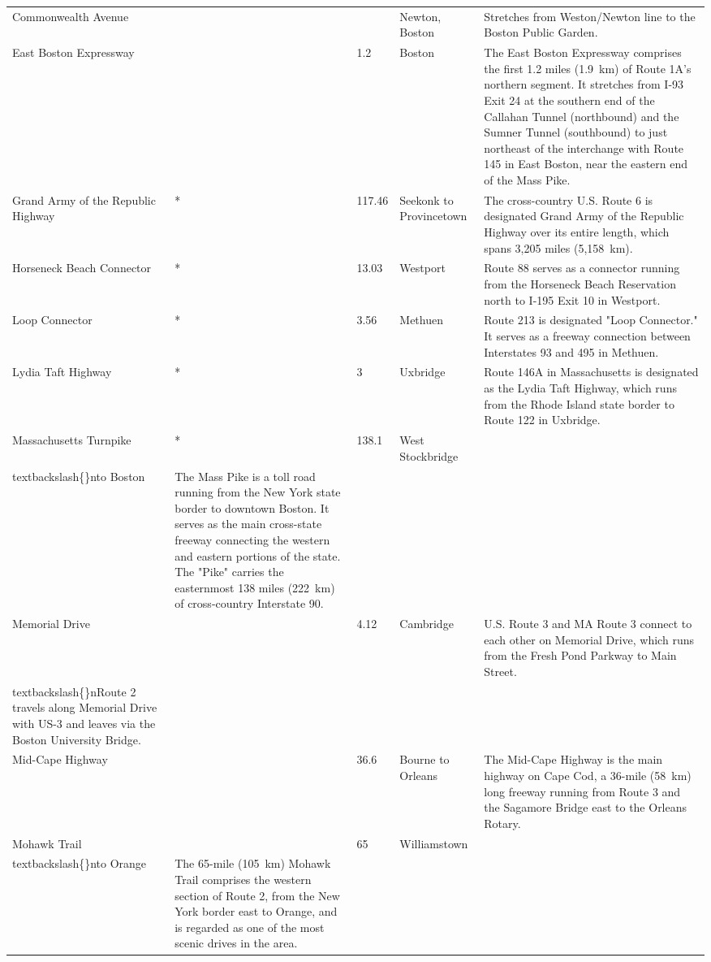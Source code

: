 \documentclass{article}
\begin{document}
\begin{tabular}{lllll}
Commonwealth Avenue &  &  & Newton, Boston & Stretches from Weston/Newton line to the Boston Public Garden. \\
East Boston Expressway &  & 1.2 & Boston & The East Boston Expressway comprises the first 1.2 miles (1.9 km) of Route 1A's northern segment. It stretches from I-93 Exit 24 at the southern end of the Callahan Tunnel (northbound) and the Sumner Tunnel (southbound) to just northeast of the interchange with Route 145 in East Boston, near the eastern end of the Mass Pike. \\
Grand Army of the Republic Highway & * & 117.46 & Seekonk to Provincetown & The cross-country U.S. Route 6 is designated Grand Army of the Republic Highway over its entire length, which spans 3,205 miles (5,158 km). \\
Horseneck Beach Connector & * & 13.03 & Westport & Route 88 serves as a connector running from the Horseneck Beach Reservation north to I-195 Exit 10 in Westport. \\
Loop Connector & * & 3.56 & Methuen & Route 213 is designated "Loop Connector." It serves as a freeway connection between Interstates 93 and 495 in Methuen. \\
Lydia Taft Highway & * & 3 & Uxbridge & Route 146A in Massachusetts is designated as the Lydia Taft Highway, which runs from the Rhode Island state border to Route 122 in Uxbridge. \\
Massachusetts Turnpike & * & 138.1 & West Stockbridge\\textbackslash\{\}nto Boston & The Mass Pike is a toll road running from the New York state border to downtown Boston. It serves as the main cross-state freeway connecting the western and eastern portions of the state. The "Pike" carries the easternmost 138 miles (222 km) of cross-country Interstate 90. \\
Memorial Drive &  & 4.12 & Cambridge & U.S. Route 3 and MA Route 3 connect to each other on Memorial Drive, which runs from the Fresh Pond Parkway to Main Street.\\textbackslash\{\}nRoute 2 travels along Memorial Drive with US-3 and leaves via the Boston University Bridge. \\
Mid-Cape Highway &  & 36.6 & Bourne to Orleans & The Mid-Cape Highway is the main highway on Cape Cod, a 36-mile (58 km) long freeway running from Route 3 and the Sagamore Bridge east to the Orleans Rotary. \\
Mohawk Trail &  & 65 & Williamstown\\textbackslash\{\}nto Orange & The 65-mile (105 km) Mohawk Trail comprises the western section of Route 2, from the New York border east to Orange, and is regarded as one of the most scenic drives in the area. \\

\end{tabular}
\end{document}
